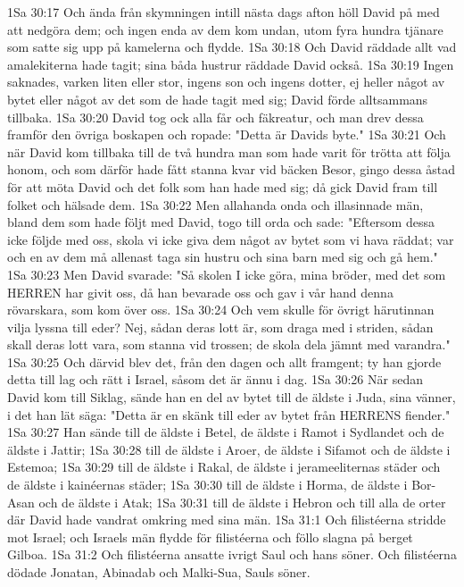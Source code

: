 1Sa 30:17  Och ända från skymningen intill nästa dags afton höll David på med att nedgöra dem; och ingen enda av dem kom undan, utom fyra hundra tjänare som satte sig upp på kamelerna och flydde.
1Sa 30:18  Och David räddade allt vad amalekiterna hade tagit; sina båda hustrur räddade David också.
1Sa 30:19  Ingen saknades, varken liten eller stor, ingens son och ingens dotter, ej heller något av bytet eller något av det som de hade tagit med sig; David förde alltsammans tillbaka.
1Sa 30:20  David tog ock alla får och fäkreatur, och man drev dessa framför den övriga boskapen och ropade: "Detta är Davids byte."
1Sa 30:21  Och när David kom tillbaka till de två hundra man som hade varit för trötta att följa honom, och som därför hade fått stanna kvar vid bäcken Besor, gingo dessa åstad för att möta David och det folk som han hade med sig; då gick David fram till folket och hälsade dem.
1Sa 30:22  Men allahanda onda och illasinnade män, bland dem som hade följt med David, togo till orda och sade: "Eftersom dessa icke följde med oss, skola vi icke giva dem något av bytet som vi hava räddat; var och en av dem må allenast taga sin hustru och sina barn med sig och gå hem."
1Sa 30:23  Men David svarade: "Så skolen I icke göra, mina bröder, med det som HERREN har givit oss, då han bevarade oss och gav i vår hand denna rövarskara, som kom över oss.
1Sa 30:24  Och vem skulle för övrigt härutinnan vilja lyssna till eder? Nej, sådan deras lott är, som draga med i striden, sådan skall deras lott vara, som stanna vid trossen; de skola dela jämnt med varandra."
1Sa 30:25  Och därvid blev det, från den dagen och allt framgent; ty han gjorde detta till lag och rätt i Israel, såsom det är ännu i dag.
1Sa 30:26  När sedan David kom till Siklag, sände han en del av bytet till de äldste i Juda, sina vänner, i det han lät säga: "Detta är en skänk till eder av bytet från HERRENS fiender."
1Sa 30:27  Han sände till de äldste i Betel, de äldste i Ramot i Sydlandet och de äldste i Jattir;
1Sa 30:28  till de äldste i Aroer, de äldste i Sifamot och de äldste i Estemoa;
1Sa 30:29  till de äldste i Rakal, de äldste i jerameeliternas städer och de äldste i kainéernas städer;
1Sa 30:30  till de äldste i Horma, de äldste i Bor-Asan och de äldste i Atak;
1Sa 30:31  till de äldste i Hebron och till alla de orter där David hade vandrat omkring med sina män.
1Sa 31:1  Och filistéerna stridde mot Israel; och Israels män flydde för filistéerna och föllo slagna på berget Gilboa.
1Sa 31:2  Och filistéerna ansatte ivrigt Saul och hans söner. Och filistéerna dödade Jonatan, Abinadab och Malki-Sua, Sauls söner.
